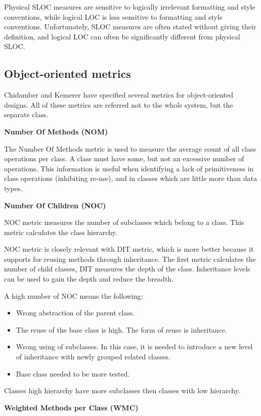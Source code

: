 Physical SLOC measures are sensitive to logically irrelevant formatting and style conventions, while logical LOC is less sensitive to formatting and style conventions. Unfortunately, SLOC measures are often stated without giving their definition, and logical LOC can often be significantly different from physical SLOC.

\subsection{Object-oriented metrics}

Chidamber and Kemerer have specified several metrics for object-oriented designs. All of these metrics are referred not to the whole system, but the separate class.

\textbf{Number Of Methods (NOM)}

The Number Of Methods metric is used to measure the average count of all class operations per class. A class must have some, but not an excessive number of operations. This information is useful when identifying a lack of primitiveness in class operations (inhibiting re-use), and in classes which are little more than data types.

\textbf{Number Of Children (NOC)}

NOC metric measures the number of subclasses which belong to a class. This metric calculates the class hierarchy.

NOC metric is closely relevant with DIT metric, which is more better because it supports for reusing methods through inheritance. The first metric calculates the number of child classes, DIT measures the depth of the class.
Inheritance levels can be used to gain the depth and reduce the breadth.

A high number of NOC means the following: 
\begin{itemize}
	\item Wrong abstraction of the parent class. 
	\item The reuse of the base class is high. The form of reuse is inheritance.
	\item Wrong using of subclasses. In this case, it is needed to introduce a new level of inheritance with newly grouped related classes.
	\item Base class needed to be more tested.
\end{itemize}

Classes high hierarchy have more subclasses then classes with low hierarchy.

\textbf{Weighted Methods per Class (WMC)}

